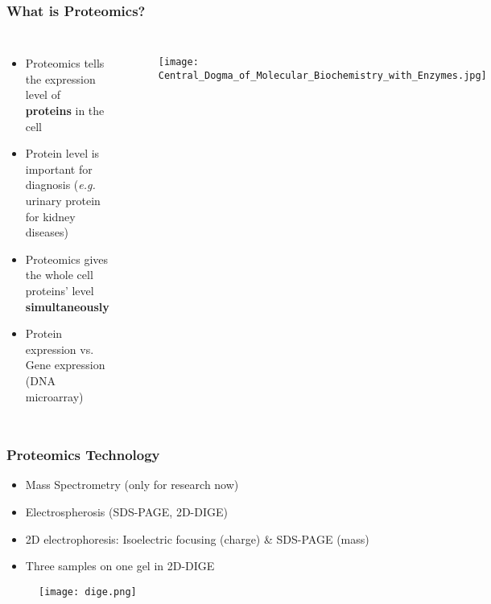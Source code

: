 \documentclass{beamer}
\begin{document}
\begin{frame}
\frametitle{What is Proteomics?}
\begin{columns}[c] %
\begin{itemize}
\item Proteomics tells the expression level of \textbf{proteins} in the cell
\item Protein level is important for diagnosis (\textit{e.g.} urinary protein for kidney diseases)
\item Proteomics gives the whole cell proteins' level \textbf{simultaneously}
\item Protein expression vs. Gene expression (DNA microarray)
\end{itemize}
\begin{figure}
\texttt{[image: Central\_Dogma\_of\_Molecular\_Biochemistry\_with\_Enzymes.jpg]}
\cite{central_dogma}
\end{figure}
\end{columns}
\end{frame}


\begin{frame}
\frametitle{Proteomics Technology}
\begin{itemize}
\item Mass Spectrometry (only for research now)
\item Electrospherosis (SDS-PAGE, 2D-DIGE\cite{unlu1997difference})
\item 2D electrophoresis: Isoelectric focusing (charge) \& SDS-PAGE (mass)
\item Three samples on one gel in 2D-DIGE
\end{itemize}
\begin{figure}
\texttt{[image: dige.png]}
\cite{appliedbiomicsDIGE}
\end{figure}
\end{frame}

\end{document}

